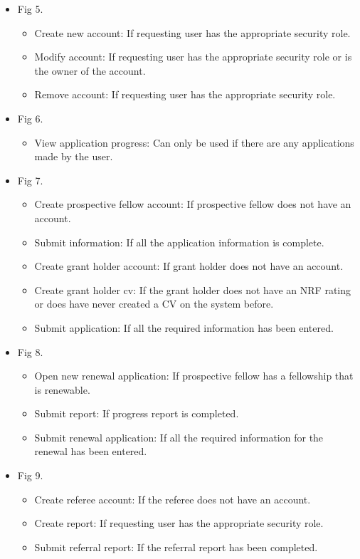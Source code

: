 \documentclass[12pt]{article}
\begin{document}
\begin{itemize}
	\item Fig 5.
			\begin{itemize}
				\item Create new account: If requesting user has the appropriate security role.
				\item Modify account: If requesting user has the appropriate security role or is the owner of the account.				
				\item Remove account: If requesting user has the appropriate security role.						
			\end{itemize}
	
	\item Fig 6.
		\begin{itemize}
			\item View application progress: Can only be used if there are any applications made by the user.
		\end{itemize}
		
	\item Fig 7.
		\begin{itemize}
			\item Create prospective fellow account: If prospective fellow does not have an account.
			\item Submit information: If all the application information is complete.				
			\item Create grant holder account: If grant holder does not have an account.
			\item Create grant holder cv: If the grant holder does not have an NRF rating or does have never created a CV on the system before.
			\item Submit application: If all the required information has been entered.									
		\end{itemize}
	
	\item Fig 8.
		\begin{itemize}
			\item Open new renewal application: If prospective fellow has a fellowship that is renewable.
			\item Submit report: If progress report is completed.				
			\item Submit renewal application: If all the required information for the renewal has been entered.									
		\end{itemize}
	
	\item Fig 9.
		\begin{itemize}
			\item Create referee account: If the referee does not have an account.
			\item Create report: If requesting user has the appropriate security role.				
			\item Submit referral report: If the referral report has been completed.									
		\end{itemize}
		

\end{itemize}
\end{document}
